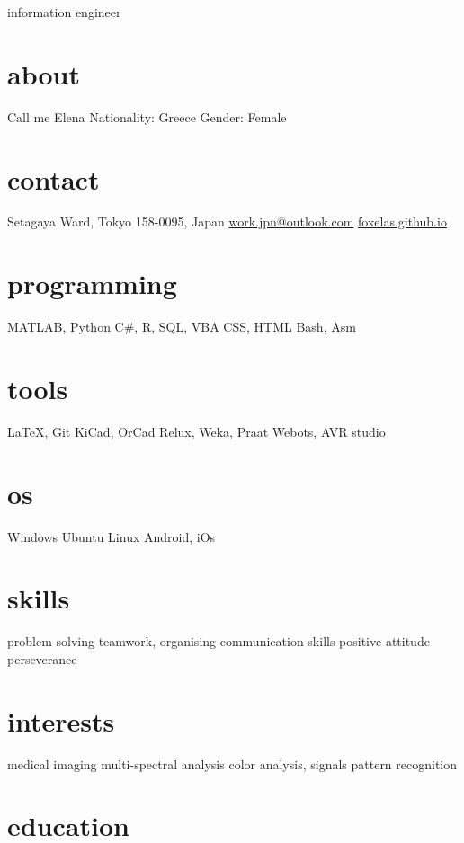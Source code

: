 \documentclass[]{friggeri-cv}
\begin{document}
       {information engineer}


\begin{aside}
  \section{about}
   Call me Elena
   Nationality: Greece
   Gender: Female
  \section{contact}
	Setagaya Ward, Tokyo 
	158-0095, Japan
    \href{mailto:work.jpn@outlook.com}{work.jpn@outlook.com}
    \href{https://foxelas.github.io}{foxelas.github.io}
    \section{programming}
    MATLAB, Python %
    C\#, R, SQL, VBA
    CSS, HTML
    Bash, Asm
    \section{tools}
    \LaTeX, Git
    KiCad, OrCad 
    Relux, Weka, Praat
    Webots, AVR studio
    \section{os}
	Windows
	Ubuntu Linux 
	Android, iOs 
    \section{skills}
    problem-solving
    teamwork, organising
    communication skills 
    positive attitude
    perseverance
    \section{interests}
    medical imaging
    multi-spectral analysis
    color analysis, signals
    pattern recognition 
\end{aside}

\section{education}
\end{document}
